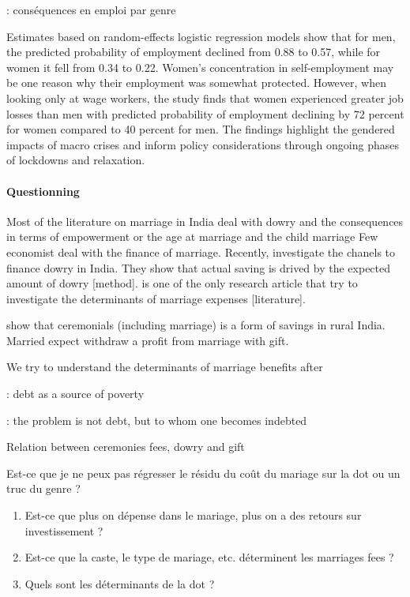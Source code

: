 \documentclass[a4paper, 11pt, onecolumn]{article}
\begin{document}
\cite{Desai2021} : conséquences en emploi par genre

Estimates based on random-effects
logistic regression models show that for men, the predicted probability of
employment declined from 0.88 to 0.57, while for women it fell from 0.34 to
0.22. Women’s concentration in self-employment may be one reason why their
employment was somewhat protected. However, when looking only at wage
workers, the study finds that women experienced greater job losses than men
with predicted probability of employment declining by 72 percent for women
compared to 40 percent for men. The findings highlight the gendered impacts
of macro crises and inform policy considerations through ongoing phases of
lockdowns and relaxation.



\paragraph{Questionning}

Most of the literature on marriage in India deal with dowry and the consequences in terms of empowerment \citep{Roy2015, Alfano2017, Srinivasan2007} or the age at marriage and the child marriage \citep{Vogl2013, Sheela2003}
Few economist deal with the finance of marriage.
Recently, \cite{Anukriti2020} investigate the chanels to finance dowry in India.
They show that actual saving is drived by the expected amount of dowry [method].
\cite{Bloch2004} is one of the only research article that try to investigate the determinants of marriage expenses [literature].

\cite{Guerin2020c} show that ceremonials (including marriage) is a form of savings in rural India.
Married expect withdraw a profit from marriage with gift.

We try to understand the determinants of marriage benefits after 

\cite{Krishna2003, Krishna2004} : debt as a source of poverty 

\cite{Guerin2014a} : the problem is not debt, but to whom one becomes indebted

Relation between ceremonies fees, dowry and gift

Est-ce que je ne peux pas régresser le résidu du coût du mariage sur la dot ou un truc du genre ?

\begin{enumerate}
\item Est-ce que plus on dépense dans le mariage, plus on a des retours sur investissement ?
\item Est-ce que la caste, le type de mariage, etc. déterminent les marriages fees ?
\item Quels sont les déterminants de la dot ?
\end{enumerate}
\end{document}
